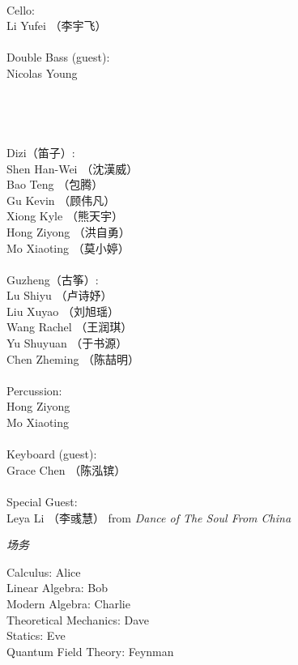 \documentclass[letter,6pt,poets]{ConcProg}
\begin{document}
\begin{spacing}{1.0}
\begin{multicols}{2}
\\
Cello:\\
Li Yufei （李宇飞）\\
\\
Double Bass (guest):\\
Nicolas Young\\
\\
\\
\\
\\
Dizi（笛子）: 				 \\    
Shen Han-Wei		（沈漢威）     \\
Bao Teng  （包腾）\\
Gu Kevin   （顾伟凡）               \\
Xiong Kyle （熊天宇）\\
Hong Ziyong （洪自勇）\\
Mo Xiaoting （莫小婷）\\
\\
Guzheng（{古筝}）:\\
Lu Shiyu （卢诗妤）\\
Liu Xuyao  （刘旭瑶）\\               
Wang Rachel （王润琪） \\
Yu Shuyuan   （于书源）\\
Chen Zheming  （陈喆明）\\
\\
Percussion:\\
Hong Ziyong \\
Mo Xiaoting \\
\\
Keyboard (guest):\\
Grace Chen （陈泓镔）
\\
\\
Special Guest:\\
Leya Li （李彧慧）
 \footnotesize{ from } \emph{ Dance of The Soul From China}
\\
\end{multicols}
\begin{center}
\Large\textsl{ 场务}
\end{center}
\begin{multicols}{2}%
Calculus: Alice\\
Linear Algebra: Bob\\
Modern Algebra: Charlie\\
Theoretical Mechanics: Dave\\
Statics: Eve\\
Quantum Field Theory: Feynman




\end{multicols}
\end{spacing}
\end{document}
